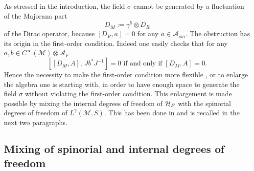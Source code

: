 \documentclass[11pt]{article}
\newcommand{\M}{\mathcal M}
\newcommand{\A}{\mathcal A}
\begin{document}
As stressed in the introduction, the field $\sigma$ cannot be
generated by a fluctuation of the Majorana part
\begin{equation}
D_M:= \gamma^5\otimes D_R
\label{eq:23}
\end{equation}
of the Dirac operator, because $[D_R, a]=0$ for any $a\in
  \A_{sm}$. The obstruction has its origin in the first-order
  condition. Indeed one easily checks \cite{Devastato:2013fk} that for any $a,b\in
C^\infty(\M)\otimes\A_F$
\begin{equation}
  \label{eq:123}
  [[D_M, A], \, J b^* J^{-1}] = 0 \text{ if and only if } [D_M, A]=0.
\end{equation}
Hence the necessity to make the first-order condition more flexible
\cite{Chamseddine:2013fk}, or to enlarge the algebra one is starting
with, in order to have enough space to generate the field
$\sigma$ without violating the first-order condition. This enlargement
is made possible by mixing the internal degrees of freedom of ${\cal
  H}_F$ with the spinorial degrees of freedom of $L^2(\M, S)$. This
has been done in \cite{Devastato:2013fk} and is recalled in the next
two paragraphs. 

\subsection{Mixing of spinorial and internal degrees of freedom} 
\label{mixing}
\end{document}
